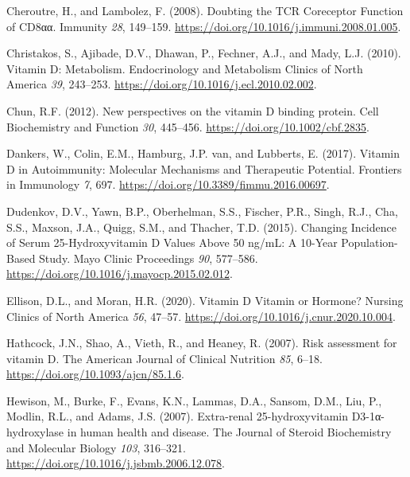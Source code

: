 \documentclass[
  a4paper,
  DIV=11,
  numbers=noendperiod,
  listof=totoc]{scrreprt}
\newlength{\cslhangindent}
\newlength{\cslentryspacingunit} %
\newenvironment{CSLReferences}[2] %
 {%
  \setlength{\parindent}{0pt}
  \ifodd #1
  \let\oldpar\par
  \def\par{\hangindent=\cslhangindent\oldpar}
  \fi
  \setlength{\parskip}{#2\cslentryspacingunit}
 }%
 {}
\begin{document}
\begin{CSLReferences}{0}{0}
\leavevmode{}%
Cheroutre, H., and Lambolez, F. (2008). {Doubting the TCR Coreceptor
Function of CD8αα}. Immunity \emph{28}, 149--159.
\url{https://doi.org/10.1016/j.immuni.2008.01.005}.

\leavevmode{}%
Christakos, S., Ajibade, D.V., Dhawan, P., Fechner, A.J., and Mady, L.J.
(2010). {Vitamin D: Metabolism}. Endocrinology and Metabolism Clinics of
North America \emph{39}, 243--253.
\url{https://doi.org/10.1016/j.ecl.2010.02.002}.

\leavevmode{}%
Chun, R.F. (2012). {New perspectives on the vitamin D binding protein}.
Cell Biochemistry and Function \emph{30}, 445--456.
\url{https://doi.org/10.1002/cbf.2835}.

\leavevmode{}%
Dankers, W., Colin, E.M., Hamburg, J.P. van, and Lubberts, E. (2017).
{Vitamin D in Autoimmunity: Molecular Mechanisms and Therapeutic
Potential}. Frontiers in Immunology \emph{7}, 697.
\url{https://doi.org/10.3389/fimmu.2016.00697}.

\leavevmode{}%
Dudenkov, D.V., Yawn, B.P., Oberhelman, S.S., Fischer, P.R., Singh,
R.J., Cha, S.S., Maxson, J.A., Quigg, S.M., and Thacher, T.D. (2015).
{Changing Incidence of Serum 25-Hydroxyvitamin D Values Above 50 ng/mL:
A 10-Year Population-Based Study}. Mayo Clinic Proceedings \emph{90},
577--586. \url{https://doi.org/10.1016/j.mayocp.2015.02.012}.

\leavevmode{}%
Ellison, D.L., and Moran, H.R. (2020). {Vitamin D Vitamin or Hormone?}
Nursing Clinics of North America \emph{56}, 47--57.
\url{https://doi.org/10.1016/j.cnur.2020.10.004}.

\leavevmode{}%
Hathcock, J.N., Shao, A., Vieth, R., and Heaney, R. (2007). {Risk
assessment for vitamin D}. The American Journal of Clinical Nutrition
\emph{85}, 6--18. \url{https://doi.org/10.1093/ajcn/85.1.6}.

\leavevmode{}%
Hewison, M., Burke, F., Evans, K.N., Lammas, D.A., Sansom, D.M., Liu,
P., Modlin, R.L., and Adams, J.S. (2007). {Extra-renal 25-hydroxyvitamin
D3-1α-hydroxylase in human health and disease}. The Journal of Steroid
Biochemistry and Molecular Biology \emph{103}, 316--321.
\url{https://doi.org/10.1016/j.jsbmb.2006.12.078}.


\end{CSLReferences}
\end{document}
